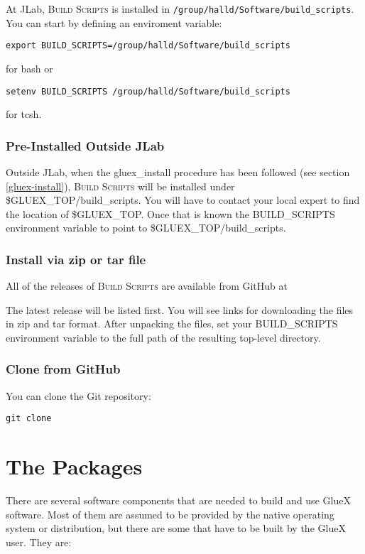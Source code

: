 \documentclass[12pt, letterpaper]{article}
\newcommand{\bs}{\textsc{Build Scripts}}
\newcommand{\bcenter}{\begin{center}}
\newcommand{\ecenter}{\end{center}}
\begin{document}
At JLab, \bs{} is installed in {\tt /group/halld/Software/build\_scripts}. You can start by defining an enviroment variable:
\begin{center}
{\tt export BUILD\_SCRIPTS=/group/halld/Software/build\_scripts}
\end{center}
for bash or
\begin{center}
{\tt setenv BUILD\_SCRIPTS\ /group/halld/Software/build\_scripts}
\end{center}
for tcsh.

\subsubsection{Pre-Installed Outside JLab}

Outside JLab, when the gluex\_install procedure has been followed (see section \ref{gluex-install}), \bs{} will be installed under \$GLUEX\_TOP/build\_scripts. You will have to contact your local expert to find the location of \$GLUEX\_TOP. Once that is known the BUILD\_SCRIPTS environment variable to point to \$GLUEX\_TOP/build\_scripts.

\subsubsection{Install via zip or tar file}

All of the releases of \bs{} are available from GitHub at
\bcenter
{}
\ecenter
The latest release will be listed first. You will see links for downloading
the files in zip and tar format. After unpacking the files, set your
BUILD\_SCRIPTS environment variable to the full path of the resulting
top-level directory.

\subsubsection{Clone from GitHub}

You can clone the Git repository:
\bcenter
  {\tt git clone }
\ecenter

\section{The Packages}

There are several software components that are needed to build and use
GlueX software. Most of them are assumed to be provided by the native
operating system or distribution, but there are some that have to be
built by the GlueX user. They are:
\end{document}
